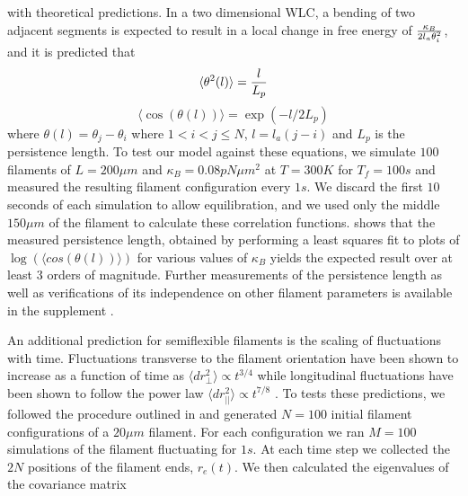 \documentclass[12pt]{article} \usepackage{times} \usepackage{graphicx}
\begin{document}
  with theoretical predictions.  In a two dimensional WLC, a bending of two
  adjacent segments is expected to result in a local change in free energy of
  ${\kappa_B\over2l_a\theta_i^2}$, and it is predicted that \cite{frontali1979}
  \begin{equation} \langle\theta^2(l)\rangle = {l\over L_p} \label{eqn:thsq}
  \end{equation} \begin{equation} \langle\cos(\theta(l))\rangle =
    \exp{(-l/2L_p)} \label{eqn:costh} \end{equation} where $\theta(l) =
  \theta_j - \theta_i$ where $1<i<j\le N$, $l = l_a(j-i)$ and $L_p$ is the
  persistence length. To test our model against these equations, we simulate
  $100$ filaments of $L=200\mu m$ and $\kappa_B=0.08 pN\mu m^2$ at $T=300K$ for
  $T_f = 100s$ and measured the resulting filament configuration every $1s$. We
  discard the first $10$ seconds of each simulation to allow equilibration, and
  we used only the middle $150 \mu m$ of the filament to calculate these
  correlation functions.
 shows that the measured persistence length, obtained by
performing a least squares fit to plots of $\log{(\langle cos(\theta(l))\rangle
)} $ for various values of $\kappa_B$ yields the expected result over at least
$3$ orders of magnitude. Further measurements of the persistence length as well
as verifications of its independence on other filament parameters is available
in the supplement .  \par An additional prediction for
semiflexible filaments is the scaling of fluctuations with time.  Fluctuations
transverse to the filament orientation have been shown to increase as a
function of time as $\langle dr_{\perp}^2\rangle\propto t^{3/4}$ while
longitudinal fluctuations have been shown to follow the power law $\langle
dr_{||}^2\rangle\propto t^{7/8}$ \cite{everaers1999}. To tests these
predictions, we followed the procedure outlined in \cite{everaers1999} and
generated $N = 100$ initial filament configurations of a $20\mu m$ filament.
For each configuration we ran $M = 100$ simulations of the filament fluctuating
for $1s$. At each time step we collected the $2N$ positions of the filament
ends, $r_e(t)$. We then calculated the eigenvalues of the covariance matrix
\end{document}
